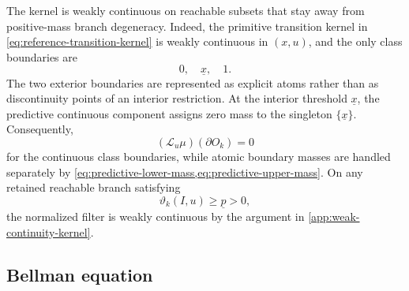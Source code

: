 \documentclass[10pt,twocolumn]{article}
\theoremstyle{remark}
\begin{document}
The kernel is weakly continuous on reachable subsets that stay away from positive-mass branch degeneracy. Indeed, the primitive transition kernel in
\cref{eq:reference-transition-kernel} is weakly continuous in \((x,u)\), and the only class boundaries are
\[
0,\quad \underline x,\quad 1.
\]
The two exterior boundaries are represented as explicit atoms rather than as discontinuity points of an interior restriction. At the interior threshold \(\underline x\), the predictive continuous component assigns zero mass to the singleton \(\{\underline x\}\). Consequently,
\begin{equation*}
	(\mathcal L_u\mu)(\partial O_k)=0
	\label{eq:reference-null-boundary}
\end{equation*}
for the continuous class boundaries, while atomic boundary masses are handled separately by
\cref{eq:predictive-lower-mass,eq:predictive-upper-mass}.
On any retained reachable branch satisfying
\[
\vartheta_k(I,u)\geq\underline p>0,
\]
the normalized filter is weakly continuous by the argument in
\cref{app:weak-continuity-kernel}.

\subsection{Bellman equation}
\label{subsec:reference-bellman-equation}
\end{document}
